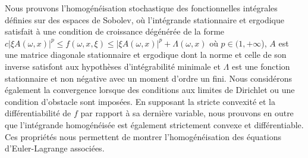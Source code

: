 \documentclass[JEP,XML,SOM,Unicode,published]{cedram}
\theoremstyle{definition}
\begin{document}
\begin{altabstract}
Nous prouvons l'homogénéisation stochastique des fonctionnelles intégrales définies sur des espaces de Sobolev, où l'intégrande stationnaire et ergodique satisfait à une condition de croissance dégénérée de la forme $c|\xi A(\omega,x)|^p\leq f(\omega,x,\xi)\leq |\xi A(\omega,x)|^p+\Lambda(\omega,x)$ où $p\in (1,+\infty$), $A$ est une matrice diagonale stationnaire et ergodique dont la norme et celle de son inverse satisfont aux hypothèses d'intégrabilité minimale et $\Lambda$ est une fonction stationnaire et non négative avec un moment d'ordre un fini. Nous considérons également la convergence lorsque des conditions aux limites de Dirichlet ou une condition d'obstacle sont imposées. En supposant la stricte convexité et la différentiabilité de $f$ par rapport à sa dernière variable, nous prouvons en outre que l'intégrande homogénéisée est également strictement convexe et différentiable. Ces propriétés nous permettent de montrer l'homogénéisation des équations d'Euler-Lagrange associées.
\end{altabstract}
\maketitle
\vspace*{-\baselineskip}
\tableofcontents
\mainmatter
\end{document}
